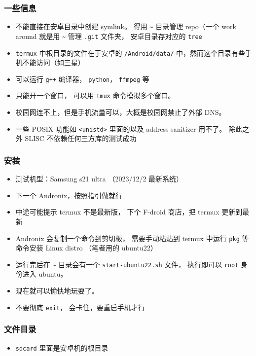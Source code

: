 

\begin{issues}
\issueDraft
\end{issues}

\subsubsection{一些信息}
\begin{itemize}
\item 不能直接在安卓目录中创建 symlink。 得用 \verb`~` 目录管理 repo（一个 work around 就是用 \verb`~` 管理 \verb`.git` 文件夹， 安卓目录存对应的 \verb`tree`
\item \verb`termux` 中根目录的文件在于安卓的 \verb`/Android/data/` 中，然而这个目录有些手机不能访问（如三星）
\item 可以运行 \verb`g++` 编译器， \verb`python`， \verb`ffmpeg` 等
\item 只能开一个窗口， 可以用 \verb`tmux` 命令模拟多个窗口。
\item 校园网连不上，但是手机流量可以，大概是校园网禁止了外部 DNS。
\item 一些 POSIX 功能如 \verb`<unistd>` 里面的以及 address sanitizer 用不了。 除此之外 SLISC 不依赖任何三方库的测试成功
\end{itemize}

\subsubsection{安装}
\begin{itemize}
\item 测试机型：Samsung s21 ultra （2023/12/2 最新系统）
\item 下一个 Andronix，按照指引做就行
\item 中途可能提示 termux 不是最新版， 下个 F-droid 商店，把 termux 更新到最新
\item Andronix 会复制一个命令到剪切板， 需要手动粘贴到 termux 中运行 \verb`pkg` 等命令安装 Linux distro （笔者用的 ubuntu22）
\item 运行完后在 \verb`~` 目录会有一个 \verb`start-ubuntu22.sh` 文件， 执行即可以 \verb`root` 身份进入 ubuntu。
\item 现在就可以愉快地玩耍了。
\item 不要彻底 \verb`exit`， 会卡住，要重启手机才行
\end{itemize}

\subsubsection{文件目录}
\begin{itemize}
\item \verb`sdcard` 里面是安卓机的根目录
\end{itemize}

